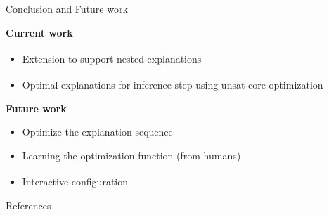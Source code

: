 \documentclass{beamer}
\begin{document}
\begin{frame}{Conclusion and Future work}

    \textbf{Current work}
    \begin{itemize}
        \item Extension to support nested explanations \textsuperscript{\cite{bogaerts2020framework}}
        \item Optimal explanations for inference step using unsat-core optimization \textsuperscript{\cite{ignatiev2013quantified}}
    \end{itemize}\pause
    \vfill
    \textbf{Future work}
    \begin{itemize}
        \item Optimize the explanation sequence
        \item Learning the optimization function (from humans)
        \item Interactive configuration \textsuperscript{\cite{fox2017explainable, van2017kb, carbonnelle2019interactive}}
    \end{itemize}
    \vfill
\end{frame}



% 

\begin{frame}{References}
    \tiny 
\end{frame}
\end{document}

